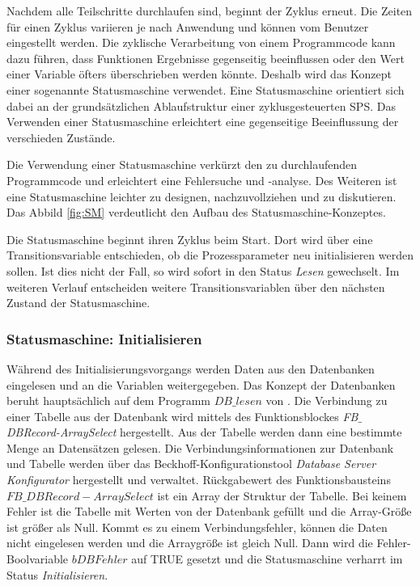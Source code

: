 Nachdem alle Teilschritte durchlaufen sind, beginnt der Zyklus erneut. Die Zeiten für einen Zyklus variieren je nach Anwendung und können vom Benutzer eingestellt werden. Die zyklische Verarbeitung von einem Programmcode kann dazu führen, dass Funktionen Ergebnisse gegenseitig beeinflussen oder den Wert einer Variable öfters überschrieben werden könnte. Deshalb wird das Konzept einer sogenannte Statusmaschine verwendet. Eine Statusmaschine orientiert sich dabei an der grundsätzlichen Ablaufstruktur einer zyklusgesteuerten SPS. Das Verwenden einer Statusmaschine erleichtert eine gegenseitige Beeinflussung der verschieden Zustände. 

Die Verwendung einer Statusmaschine verkürzt den zu durchlaufenden Programmcode und erleichtert eine Fehlersuche und -analyse. Des Weiteren ist eine Statusmaschine leichter zu designen, nachzuvollziehen und zu diskutieren. Das Abbild \ref{fig:SM} verdeutlicht den Aufbau des Statusmaschine-Konzeptes. 

Die Statusmaschine beginnt ihren Zyklus beim Start. Dort wird über eine Transitionsvariable entschieden, ob die Prozessparameter neu initialisieren werden sollen. Ist dies nicht der Fall, so wird sofort in den Status \textit{Lesen} gewechselt. Im weiteren Verlauf entscheiden weitere Transitionsvariablen über den nächsten Zustand der Statusmaschine.  

\subsubsection*{Statusmaschine: Initialisieren}

Während des Initialisierungsvorgangs werden Daten aus den Datenbanken eingelesen und an die Variablen weitergegeben. Das Konzept der Datenbanken beruht hauptsächlich auf dem Programm $DB\_lesen$ von \textsc{\citeauthor{Nuerenberg2015}}\citep{Nuerenberg2015}. 
Die Verbindung zu einer Tabelle aus der Datenbank wird mittels des Funktionsblockes \textit{FB$\_$DBRecord-ArraySelect} hergestellt. Aus der Tabelle werden dann eine bestimmte Menge an Datensätzen gelesen. 
Die Verbindungsinformationen zur Datenbank und Tabelle werden über das Beckhoff-Konfigurationstool \textit{Database Server Konfigurator} hergestellt und verwaltet. 
Rückgabewert des Funktionsbausteins $FB\_DBRecord-ArraySelect$ ist ein Array der Struktur der Tabelle. Bei keinem Fehler ist die Tabelle mit Werten von der Datenbank gefüllt und die Array-Größe  ist größer als Null. Kommt es zu einem Verbindungsfehler, können die Daten nicht eingelesen werden und die Arraygröße ist gleich Null. Dann wird die Fehler-Boolvariable $bDBFehler$ auf TRUE gesetzt und die Statusmaschine verharrt im Status \textit{Initialisieren}. 


